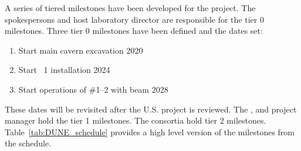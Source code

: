 A series of tiered milestones have been developed for the 
project. The spokespersons and host laboratory director are
responsible for the tier 0 milestones. Three tier 0 milestones have
been defined and the dates set:
\begin{enumerate}
\item Start main cavern excavation \hspace{2.58in} 2020
\item Start ~1 installation \hspace{2.1in} 2024
\item Start operations of  \#1--2 with beam \hspace{0.8in} 2028
\end{enumerate}
These dates will be revisited after the U.S.  project is
reviewed. The ,  and  project
manager hold the tier 1 milestones.  The consortia hold tier 2
milestones. Table~\ref{tab:DUNE_schedule} provides a high level version of the
 milestones from the  schedule.


